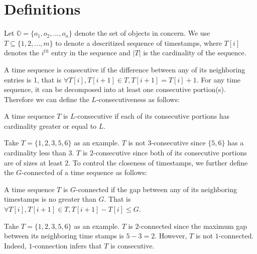 \section{Definitions}
\label{sec:definition}
Let $\mathbb{O} = \{o_1 ,o_2,...,o_n\}$ denote the set of objects in concern. 
We use $T \subseteq \{1,2,...,m\}$ to denote a descritized sequence of timestamps, where
$T[i]$ denotes the $i^{th}$ entry in the sequence and $|T|$ is the 
cardinality of the sequence.

A time sequence is consecutive if the difference between any of its neighboring entries
is 1, that is $\forall T[i], T[i+1] \in T, T[i+1] = T[i] + 1$. For any time sequence,
it can be decomposed into at least one consecutive portion(s). Therefore we can define the 
$L$-consecutiveness as follows:
%
%

\begin{definition}
A time sequence $T$ is $L$-consecutive if each of its consecutive portions 
has cardinality greater or equal to $L$.
\end{definition}

Take $T=\{1,2,3,5,6\}$ as an example. $T$ is not $3$-consecutive since $\{5,6\}$ has a cardinality less than $3$. $T$ is $2$-consecutive since both of its consecutive portions are of sizes at least $2$.
To control the closeness of timestamps, we further define the $G$-connected of a time sequence as follows:

\begin{definition}[$G$-connected]
A time sequence $T$ is $G$-connected if the gap between any of its neighboring timestamps is no greater than $G$. That is
 $\forall T[i],T[i+1] \in T, T[i+1]-T[i] \leq G$.
\end{definition}

Take $T=\{1,2,3,5,6\}$ as an example. $T$ is $2$-connected since the maximum gap between its neighboring time stamps is $5-3=2$. However, $T$ is not $1$-connected. Indeed, $1$-connection infers that $T$ is consecutive.

